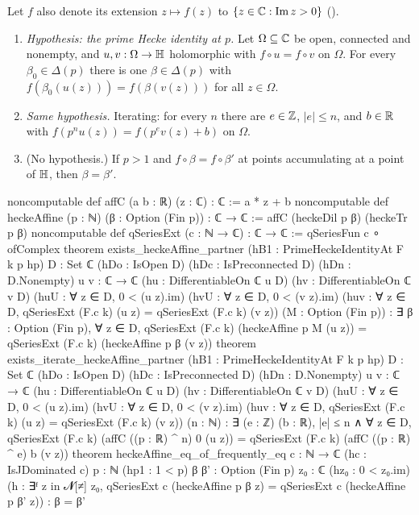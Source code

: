 \begin{theorem}\label{ch19:thm:partner}
Let $f$ also denote its extension $z\mapsto f(z)$ to $\{z\in{\mathbb{C}}:\operatorname{Im}z>0\}$ ().
\begin{enumerate}[label=(\alph*)]
\item \emph{Hypothesis: the prime Hecke identity at $p$.}  Let $\Omega\subseteq{\mathbb{C}}$ be open, connected and nonempty, and
  $u,v:\Omega\to\mathbb{H}$ holomorphic with $f\circ u=f\circ v$ on $\Omega$.  For every $\beta_0\in\Delta(p)$ there is one $\beta\in\Delta(p)$
  with $f(\beta_0(u(z)))=f(\beta(v(z)))$ for all $z\in\Omega$.
\item \emph{Same hypothesis.}  Iterating: for every $n$ there are $e\in{\mathbb{Z}}$, $|e|\le n$, and $b\in\mathbb{R}$ with
  $f(p^nu(z))=f(p^ev(z)+b)$ on $\Omega$.
\item (No hypothesis.)  If $p>1$ and $f\circ\beta=f\circ\beta'$ at points accumulating at a point of $\mathbb{H}$, then $\beta=\beta'$.
\end{enumerate}
\end{theorem}
\begin{leancode}
noncomputable def affC (a b : ℝ) (z : ℂ) : ℂ := a * z + b
noncomputable def heckeAffine (p : ℕ) (β : Option (Fin p)) : ℂ → ℂ :=
  affC (heckeDil p β) (heckeTr p β)
noncomputable def qSeriesExt (c : ℕ → ℂ) : ℂ → ℂ :=
  qSeriesFun c ∘ ofComplex
theorem exists_heckeAffine_partner (hB1 : PrimeHeckeIdentityAt F k p hp) {D : Set ℂ}
    (hDo : IsOpen D) (hDc : IsPreconnected D) (hDn : D.Nonempty) {u v : ℂ → ℂ}
    (hu : DifferentiableOn ℂ u D) (hv : DifferentiableOn ℂ v D)
    (huU : ∀ z ∈ D, 0 < (u z).im) (hvU : ∀ z ∈ D, 0 < (v z).im)
    (huv : ∀ z ∈ D, qSeriesExt (F.c k) (u z) = qSeriesExt (F.c k) (v z)) (M : Option (Fin p)) :
    ∃ β : Option (Fin p), ∀ z ∈ D,
      qSeriesExt (F.c k) (heckeAffine p M (u z)) = qSeriesExt (F.c k) (heckeAffine p β (v z))
theorem exists_iterate_heckeAffine_partner (hB1 : PrimeHeckeIdentityAt F k p hp) {D : Set ℂ}
    (hDo : IsOpen D) (hDc : IsPreconnected D) (hDn : D.Nonempty) {u v : ℂ → ℂ}
    (hu : DifferentiableOn ℂ u D) (hv : DifferentiableOn ℂ v D)
    (huU : ∀ z ∈ D, 0 < (u z).im) (hvU : ∀ z ∈ D, 0 < (v z).im)
    (huv : ∀ z ∈ D, qSeriesExt (F.c k) (u z) = qSeriesExt (F.c k) (v z)) (n : ℕ) :
    ∃ (e : ℤ) (b : ℝ), |e| ≤ n ∧ ∀ z ∈ D,
      qSeriesExt (F.c k) (affC ((p : ℝ) ^ n) 0 (u z)) =
        qSeriesExt (F.c k) (affC ((p : ℝ) ^ e) b (v z))
theorem heckeAffine_eq_of_frequently_eq {c : ℕ → ℂ} (hc : IsJDominated c) {p : ℕ} (hp1 : 1 < p)
    {β β' : Option (Fin p)} {z₀ : ℂ} (hz₀ : 0 < z₀.im)
    (h : ∃ᶠ z in 𝓝[≠] z₀, qSeriesExt c (heckeAffine p β z) = qSeriesExt c (heckeAffine p β' z)) :
    β = β'
\end{leancode}
